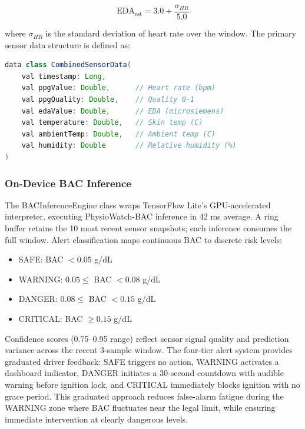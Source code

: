 \documentclass[HARVARD,Times2COL]{WileyNJDv5} %
\providecommand{\DIFadd}[1]{{\protect\color{red} #1}} %
\providecommand{\DIFaddbegin}{} %
\providecommand{\DIFaddincludegraphics}[2][]{{\color{blue}\fbox{\DIFOincludegraphics[#1]{#2}}}} %
\DeclareRobustCommand{\DIFaddbegin}{\DIFOaddbegin \let\includegraphics\DIFaddincludegraphics} %
\begin{document}
\begin{equation}
\text{EDA}_{\text{est}} = 3.0 + \frac{\sigma_{HR}}{5.0}
\end{equation}

where $\sigma_{HR}$ is the standard deviation of heart rate over the window.
The primary sensor data structure is defined as:
\begin{lstlisting}[language=Java, caption={Combined Sensor Data Structure (Kotlin)}, label={lst:sensordata}]
data class CombinedSensorData(
    val timestamp: Long,
    val ppgValue: Double,      // Heart rate (bpm)
    val ppgQuality: Double,    // Quality 0-1
    val edaValue: Double,      // EDA (microsiemens)
    val temperature: Double,   // Skin temp (C)
    val ambientTemp: Double,   // Ambient temp (C)
    val humidity: Double       // Relative humidity (%)
)
\end{lstlisting}
\subsubsection{On-Device BAC Inference}
The BACInferenceEngine class wraps TensorFlow Lite's GPU-accelerated interpreter, executing PhysioWatch-BAC inference in 42 ms average. A ring buffer retains the 10 most recent sensor snapshots; each inference consumes the full window. Alert classification maps continuous BAC to discrete risk levels:
\begin{itemize}
    \item SAFE: BAC $< 0.05$ g/dL
    \item WARNING: $0.05 \leq$ BAC $< 0.08$ g/dL
    \item DANGER: $0.08 \leq$ BAC $< 0.15$ g/dL
    \item CRITICAL: BAC $\geq 0.15$ g/dL
\end{itemize}

Confidence scores (0.75--0.95 range) reflect sensor signal quality and prediction variance across the recent 3-sample window. \DIFaddbegin \DIFadd{The four-tier alert system provides graduated driver feedback: SAFE triggers no action, WARNING activates a dashboard indicator, DANGER initiates a 30-second countdown with audible warning before ignition lock, and CRITICAL immediately blocks ignition with no grace period. This graduated approach reduces false-alarm fatigue during the WARNING zone where BAC fluctuates near the legal limit, while ensuring immediate intervention at clearly dangerous levels.
}
\end{document}
